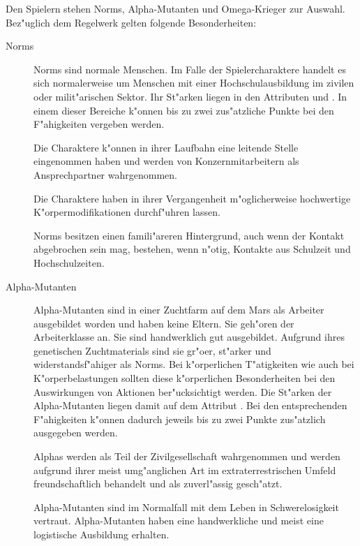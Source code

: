 
Den Spielern stehen Norms, Alpha-Mutanten und Omega-Krieger zur Auswahl. Bez"uglich dem Regelwerk gelten folgende Besonderheiten:

\begin{description}
    \item[Norms] Norms sind normale Menschen. Im Falle der Spielercharaktere handelt es sich normalerweise um Menschen mit einer 
        Hochschulausbildung im zivilen oder milit"arischen Sektor. Ihr St"arken liegen in den Attributen  und . In einem dieser Bereiche k"onnen bis zu zwei zus"atzliche Punkte bei den F"ahigkeiten vergeben werden. 
        
        Die Charaktere k"onnen in ihrer Laufbahn eine leitende Stelle eingenommen haben und werden von Konzernmitarbeitern als Ansprechpartner wahrgenommen. 
        
        Die Charaktere haben in ihrer Vergangenheit m"oglicherweise hochwertige K"orpermodifikationen durchf"uhren lassen.
      
        Norms besitzen einen famili"areren Hintergrund, auch wenn der Kontakt abgebrochen sein mag, bestehen, wenn n"otig, Kontakte aus Schulzeit und Hochschulzeiten.
    \item[Alpha-Mutanten] Alpha-Mutanten sind in einer Zuchtfarm auf dem Mars als Arbeiter ausgebildet worden und haben keine Eltern. 
        Sie geh"oren der Arbeiterklasse an. Sie sind handwerklich gut ausgebildet. Aufgrund ihres genetischen Zuchtmaterials sind sie gr"o\3er, st"arker und widerstandsf"ahiger als Norms. Bei k"orperlichen T"atigkeiten wie auch bei K"orperbelastungen sollten diese k"orperlichen Besonderheiten bei den Auswirkungen von Aktionen ber"ucksichtigt werden. Die St"arken der Alpha-Mutanten liegen damit auf dem Attribut . Bei den entsprechenden F"ahigkeiten k"onnen dadurch jeweils bis zu zwei Punkte zus"atzlich ausgegeben werden. 
        
        Alphas werden als Teil der Zivilgesellschaft wahrgenommen und werden aufgrund ihrer meist umg"anglichen Art im extraterrestrischen Umfeld freundschaftlich behandelt und als zuverl"assig gesch"atzt. 
        
        Alpha-Mutanten sind im Normalfall mit dem Leben in Schwerelosigkeit vertraut. Alpha-Mutanten haben eine handwerkliche und meist eine logistische Ausbildung erhalten. 
        

\end{description}
